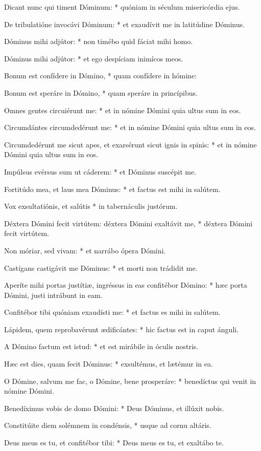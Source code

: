 Dicant nunc qui timent Dóminum: * quóniam in séculum misericórdia ejus.

De tribulatióne invocávi Dóminum: * et exaudívit me in latitúdine Dóminus.

Dóminus mihi adjútor: * non timébo quid fáciat mihi homo.

Dóminus mihi adjútor: * et ego despíciam inimícos meos.

Bonum est confídere in Dómino, * quam confídere in hómine:

Bonum est speráre in Dómino, * quam speráre in princípibus.

Omnes gentes circuiérunt me: * et in nómine Dómini quia ultus sum in eos.

Circumdántes circumdedérunt me: * et in nómine Dómini quia ultus sum in eos.

Circumdedérunt me sicut apes, et exarsérunt sicut ignis in spinis: * et in nómine Dómini quia ultus sum in eos.

Impúlsus evérsus sum ut cáderem: * et Dóminus suscépit me.

Fortitúdo mea, et laus mea Dóminus: * et factus est mihi in salútem.

Vox exsultatiónis, et salútis * in tabernáculis justórum.

Déxtera Dómini fecit virtútem: déxtera Dómini exaltávit me, * déxtera Dómini fecit virtútem.

Non móriar, sed vivam: * et narrábo ópera Dómini.

Castígans castigávit me Dóminus: * et morti non trádidit me.

Aperíte mihi portas justítiæ, ingréssus in eas confitébor Dómino: * hæc porta Dómini, justi intrábunt in eam.

Confitébor tibi quóniam exaudísti me: * et factus es mihi in salútem.

Lápidem, quem reprobavérunt ædificántes: * hic factus est in caput ánguli.

A Dómino factum est istud: * et est mirábile in óculis nostris.

Hæc est dies, quam fecit Dóminus: * exsultémus, et lætémur in ea.

O Dómine, salvum me fac, o Dómine, bene prosperáre: * benedíctus qui venit in nómine Dómini.

Benedíximus vobis de domo Dómini: * Deus Dóminus, et illúxit nobis.

Constitúite diem solémnem in condénsis, * usque ad cornu altáris.

Deus meus es tu, et confitébor tibi: * Deus meus es tu, et exaltábo te.

